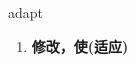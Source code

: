 
\begin{frame}
{\huge adapt}
\begin{center}
\begin{enumerate}\Large
  \item \textbf{修改，使(适应)}
\end{enumerate}
\end{center}
\end{frame}
